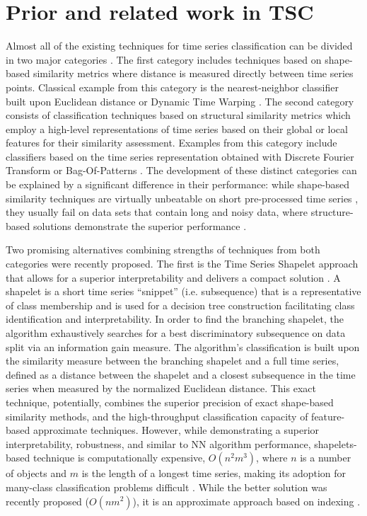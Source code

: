 \section{Prior and related work in TSC} \label{sax_vsm_prior}
Almost all of the existing techniques for time series classification can be divided in two major categories \cite{citeulike:11796594}. 
The first category includes techniques based on shape-based similarity metrics where distance is measured directly between 
time series points. Classical example from this category is the nearest-neighbor classifier built upon Euclidean distance 
\cite{citeulike:4214336} or Dynamic Time Warping \cite{senin2008dynamic}. 
The second category consists of classification techniques based on structural similarity metrics which employ a high-level 
representations of time series based on their global or local features for their similarity assessment. 
Examples from this category include classifiers based on the time series representation obtained with 
Discrete Fourier Transform \cite{citeulike:5094223} or Bag-Of-Patterns \cite{citeulike:10525778}. 
The development of these distinct categories can be explained by a significant difference in their performance: 
while shape-based similarity techniques are virtually unbeatable on short pre-processed time series \cite{citeulike:532340}, 
they usually fail on data sets that contain long and noisy data, 
where structure-based solutions demonstrate the superior performance \cite{citeulike:10525778}. 

Two promising alternatives combining strengths of techniques from both categories were recently proposed.
The first is the Time Series Shapelet approach that allows for a superior interpretability and delivers a compact 
solution \cite{citeulike:7344347}. 
A shapelet is a short time series ``snippet'' (i.e. subsequence) that is a representative of class membership and is used for 
a decision tree construction facilitating class identification and interpretability.
In order to find the branching shapelet, the algorithm exhaustively searches for a best discriminatory subsequence on data split 
via an information gain measure. The algorithm's classification is built upon the similarity measure between the branching 
shapelet and a full time series, defined as a distance between the shapelet and a closest subsequence in the time series 
when measured by the normalized Euclidean distance. This exact technique, potentially, combines the superior precision of 
exact shape-based similarity methods, and the high-throughput classification capacity of feature-based approximate techniques. 
However, while demonstrating a superior interpretability, robustness, and similar to NN algorithm performance, shapelets-based 
technique is computationally expensive, $O(n^{2}m^{3})$, where $n$ is a number of objects and $m$ is the length of a longest 
time series, making its adoption for many-class classification problems difficult \cite{citeulike:11345338}. 
While the better solution was recently proposed ($O(nm^{2})$), it is an approximate approach based on indexing \cite{citeulike:12563493}.

